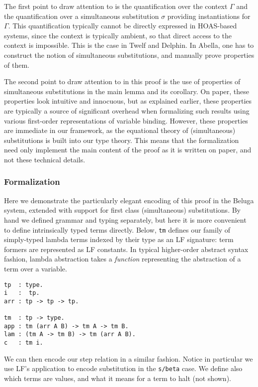 \documentclass{article}
\begin{document}
The first point to draw attention to is the quantification
over the context $\Gamma$ and the quantification over a simultaneous
substitution $\sigma$ providing instantiations for $\Gamma$. This
quantification typically cannot be directly expressed in HOAS-based
systems, since the context is typically ambient, so that direct
access to the context is impossible. This is the case in Twelf and
Delphin. In Abella, one has to construct the notion of simultaneous
substitutions, and manually prove properties of them.

The second point to draw attention to in this proof is the use of
properties of simultaneous substitutions in the main
lemma and its corollary. On paper, these properties look intuitive and
innocuous, but as explained earlier, these properties are typically a source of
significant overhead when formalizing such results using various first-order 
representations of variable binding. However, these
properties are immediate in our framework, as
the equational theory of (simultaneous) substitutions is built into
our type theory. This means that the formalization need only implement
the main content of the proof as it is written on paper, and not these
technical details.

\subsubsection{Formalization}\label{sec:belugaweaknorm}

Here we demonstrate the particularly elegant encoding of this proof in
the Beluga system, extended with support for first
class (simultaneous) substitutions. By hand we defined grammar and
typing separately, but here it is more convenient to define
intrinsically typed terms directly. Below, \lstinline{tm} defines our family of simply-typed lambda
terms indexed by their type as an LF signature: term formers are
represented as LF constants. In typical higher-order abstract syntax fashion, lambda
abstraction takes a \emph{function} representing the abstraction of a
term over a variable.

\begin{lstlisting}
tp  : type.               
i   :  tp.
arr : tp -> tp -> tp.

tm  : tp -> type.
app : tm (arr A B) -> tm A -> tm B.
lam : (tm A -> tm B) -> tm (arr A B).
c   : tm i.
\end{lstlisting}

We can then encode our step relation in a similar fashion. Notice in
particular we use LF's application to encode substitution in the
\lstinline{s/beta} case. We define also which terms are values, and
what it means for a term to halt (not shown). 
\end{document}
